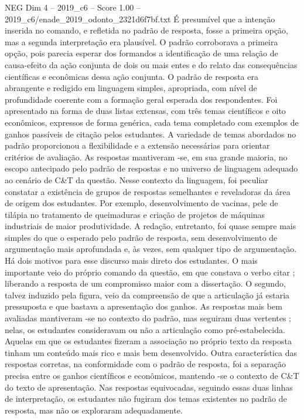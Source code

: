 \begin{textsample}{NEG Dim 4 – 2019\_c6 – Score 1.00 – 2019\_c6/enade\_2019\_odonto\_2321d6f7bf.txt}
É presumível que a intenção inserida no comando, e refletida no padrão de resposta, fosse a primeira opção, mas a segunda interpretação era plausível.
O padrão corroborava a primeira opção, pois parecia esperar dos formandos a identificação de uma relação de causa-efeito da ação conjunta de dois ou mais entes e do relato das consequências científicas e econômicas dessa ação conjunta.
O padrão de resposta era abrangente e redigido em linguagem simples, apropriada, com nível de profundidade coerente com a formação geral esperada dos respondentes.
Foi apresentado na forma de duas listas extensas, com três temas científicos e oito econômicos, expressos de forma genérica, cada tema completado com exemplos de ganhos passíveis de citação pelos estudantes.
A variedade de temas abordados no padrão proporcionou a flexibilidade e a extensão necessárias para orientar critérios de avaliação.
As respostas mantiveram -se, em sua grande maioria, no escopo antecipado pelo padrão de respostas e no universo de linguagem adequado ao cenário de C\&T da questão.
Nesse contexto da linguagem, foi peculiar constatar a existência de grupos de respostas semelhantes e reveladoras da área de origem dos estudantes.
Por exemplo, desenvolvimento de vacinas, pele de tilápia no tratamento de queimaduras e criação de projetos de máquinas industriais de maior produtividade.
A redação, entretanto, foi quase sempre mais simples do que o esperado pelo padrão de resposta, sem desenvolvimento de argumentação mais aprofundada e, às vezes, sem qualquer tipo de argumentação.
Há dois motivos para esse discurso mais direto dos estudantes.
O mais importante veio do próprio comando da questão, em que constava o verbo citar ; liberando a resposta de um compromisso maior com a dissertação.
O segundo, talvez induzido pela figura, veio da compreensão de que a articulação já estaria pressuposta e que bastava a apresentação dos ganhos.
As respostas mais bem avaliadas mantiveram -se no contexto do padrão, mas seguiram duas vertentes ; nelas, os estudantes consideravam ou não a articulação como pré-estabelecida.
Aquelas em que os estudantes fizeram a associação no próprio texto da resposta tinham um conteúdo mais rico e mais bem desenvolvido.
Outra característica das respostas corretas, na conformidade com o padrão de resposta, foi a separação precisa entre os ganhos científicos e econômicos, mantendo -se o contexto de C\&T do texto de apresentação.
Nas respostas equivocadas, seguindo essas duas linhas de interpretação, os estudantes não fugiram dos temas existentes no padrão de resposta, mas não os exploraram adequadamente.

\end{textsample}
